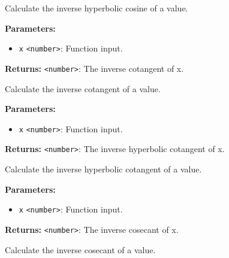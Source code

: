 \documentclass[12pt,a4paper]{article}
\begin{document}
\noindent Calculate the inverse hyperbolic cosine of a value.

\vspace{5mm}
\noindent {}


\noindent \textbf{Parameters:}
\begin{itemize}
  \item \texttt{x} \texttt{<number>}: Function input.
\end{itemize}

\noindent \textbf{Returns:} \texttt{<number>}: The inverse cotangent of \textasciigrave{}x\textasciigrave{}.

\noindent Calculate the inverse cotangent of a value.

\vspace{5mm}
\noindent {}


\noindent \textbf{Parameters:}
\begin{itemize}
  \item \texttt{x} \texttt{<number>}: Function input.
\end{itemize}

\noindent \textbf{Returns:} \texttt{<number>}: The inverse hyperbolic cotangent of \textasciigrave{}x\textasciigrave{}.

\noindent Calculate the inverse hyperbolic cotangent of a value.

\vspace{5mm}
\noindent {}


\noindent \textbf{Parameters:}
\begin{itemize}
  \item \texttt{x} \texttt{<number>}: Function input.
\end{itemize}

\noindent \textbf{Returns:} \texttt{<number>}: The inverse cosecant of \textasciigrave{}x\textasciigrave{}.

\noindent Calculate the inverse cosecant of a value.

\vspace{5mm}
\noindent {}
\end{document}
